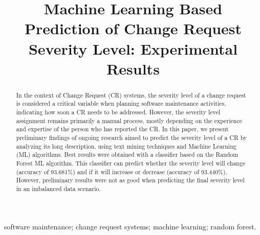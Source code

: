 \documentclass[10pt, conference]{IEEEtran}
\begin{document}
\title{Machine Learning Based Prediction of Change Request Severity Level: Experimental Results}

\author{
\and
{}
}

\maketitle

\begin{abstract}
In the context of Change Request (CR) systems, the severity level of a change request is considered a critical variable when planning software maintenance activities, indicating how soon a CR needs to be addressed. However, the severity level assignment remains primarily a manual process, mostly depending on the experience and expertise of the person who has reported the CR. In this paper, we present preliminary findings of ongoing research aimed to predict the severity level of a CR by analyzing its long description, using text mining techniques and Machine Learning (ML) algorithms. Best results were obtained with a classifier based on the Random Forest ML algorithm. This classifier can predict whether the severity level will change (accuracy of 93.681\%) and if it will increase or decrease (accuracy of 93.440\%). However, preliminary results were not as good when predicting the final severity level in an imbalanced data scenario. 

\end{abstract}

\begin{IEEEkeywords}
software maintenance; change request systems; machine learning; random forest.
\end{IEEEkeywords}


%
\IEEEpeerreviewmaketitle
\end{document}
